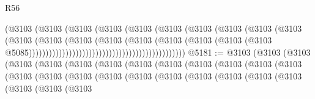 \begin{lexlean}{R56}
\begin{coremodule}
                                                            (@3103
                                                              (@3103
                                                                (@3103
                                                                  (@3103
                                                                    (@3103
                                                                      (@3103
                                                                        (@3103
                                                                          (@3103
                                                                            (@3103
                                                                              (@3103
                                                                                (@3103
                                                                                  (@3103
                                                                                    (@3103
                                                                                      (@3103
                                                                                        (@3103
                                                                                          (@3103
                                                                                            (@3103
                                                                                              (@3103
                                                                                                (@3103
                                                                                                  @5085)))))))))))))))))))))))))))))))))))))))))))))))
@5181 := @3103
    (@3103
      (@3103
        (@3103
          (@3103
            (@3103
              (@3103
                (@3103
                  (@3103
                    (@3103
                      (@3103
                        (@3103
                          (@3103
                            (@3103
                              (@3103
                                (@3103
                                  (@3103
                                    (@3103
                                      (@3103
                                        (@3103
                                          (@3103
                                            (@3103
                                              (@3103
                                                (@3103
                                                  (@3103
                                                    (@3103

\end{coremodule}
\end{lexlean}
